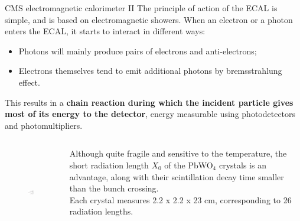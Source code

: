 \documentclass[8pt]{beamer}
\begin{document}
\begin{frame}{CMS electromagnetic calorimeter II}
\justifying
\vspace{10pt}
The principle of action of the ECAL is simple, and is based on \alert{electromagnetic showers}. When an electron or a photon enters the ECAL, it starts to interact in different ways:
\begin{itemize}
\item Photons will mainly produce pairs of electrons and anti-electrons;
\item Electrons themselves tend to emit additional photons by bremsstrahlung effect.
\end{itemize}
This results in a \textbf{chain reaction during which the incident particle gives most of its energy to the detector}, energy measurable using photodetectors and photomultipliers. \vfill

\begin{columns}
	\begin{column}{0.45 \textwidth}
\begin{figure}[htbp]
\begin{center}
\includegraphics[width=5.2cm, height=4cm]{figs/EMShowers.png}
\end{center}
\end{figure}
\end{column}
	\begin{column}{0.52 \textwidth}
	\justifying
	Although quite fragile and sensitive to the temperature, the short radiation length $X_0$ of the PbWO$_4$ crystals is an advantage, along with their scintillation decay time smaller than the bunch crossing.  \\ \vspace{10pt}
	Each crystal measures 2.2 x 2.2 x 23 cm, corresponding to 26 radiation lengths.
	\end{column}
	\end{columns} \vfill
\end{frame}
\end{document}
